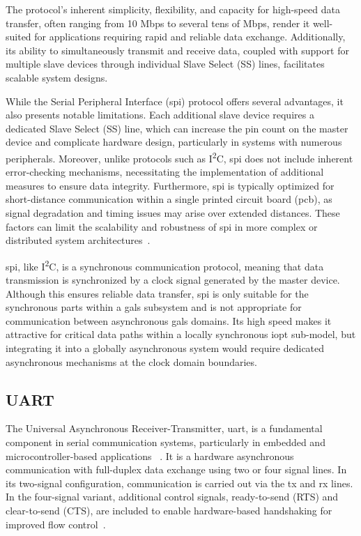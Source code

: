 The protocol’s inherent simplicity, flexibility, and capacity for high-speed data transfer, often ranging from 10 Mbps to several tens of Mbps, render it well-suited for applications requiring rapid and reliable data exchange. Additionally, its ability to simultaneously transmit and receive data, coupled with support for multiple slave devices through individual Slave Select (SS) lines, facilitates scalable system designs.

While the Serial Peripheral Interface (\gls{spi}) protocol offers several advantages, it also presents notable limitations. Each additional slave device requires a dedicated Slave Select (SS) line, which can increase the pin count on the master device and complicate hardware design, particularly in systems with numerous peripherals. Moreover, unlike protocols such as  I\textsuperscript{2}C, \gls{spi} does not include inherent error-checking mechanisms, necessitating the implementation of additional measures to ensure data integrity. Furthermore, \gls{spi} is typically optimized for short-distance communication within a single printed circuit board (\gls{pcb}), as signal degradation and timing issues may arise over extended distances. These factors can limit the scalability and robustness of \gls{spi} in more complex or distributed system architectures~\cite{spisite2}.


\gls{spi}, like I\textsuperscript{2}C, is a synchronous communication protocol, meaning that data transmission is synchronized by a clock signal generated by the master device. Although this ensures reliable data transfer, \gls{spi} is only suitable for the synchronous parts within a \gls{gals} subsystem and is not appropriate for communication between asynchronous \gls{gals} domains. Its high speed makes it attractive for critical data paths within a locally synchronous \gls{iopt} sub-model, but integrating it into a globally asynchronous system would require dedicated asynchronous mechanisms at the clock domain boundaries.

\subsection{UART}
\label{sub:uart}

The Universal Asynchronous Receiver-Transmitter, \gls{uart}, is a fundamental component in serial communication systems, particularly in embedded and microcontroller-based applications ~\cite{UARTwiki}. It is a hardware asynchronous communication with full-duplex data exchange using two or four signal lines. In its two-signal configuration, communication is carried out via the \gls{tx} and \gls{rx} lines. In the four-signal variant, additional control signals, ready-to-send (RTS) and clear-to-send (CTS), are included to enable hardware-based handshaking for improved flow control~\cite{Rao2021}.

